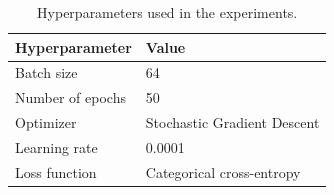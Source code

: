 \documentclass{article}
\begin{document}
\begin{table}[h!]
    \centering
    \caption{Hyperparameters used in the experiments.}
    \begin{tabular}{ll}
    \hline
    \textbf{Hyperparameter} & \textbf{Value} \\ \hline
    Batch size & 64 \\ 
    Number of epochs & 50 \\
    Optimizer & Stochastic Gradient Descent \\
    Learning rate & 0.0001 \\ 
    Loss function & Categorical cross-entropy \\ \hline
    \end{tabular}
    \label{table:hyperparameters}
\end{table}



\end{document}
